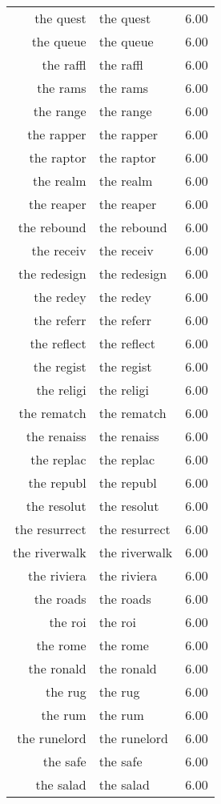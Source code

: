 \begin{table}[ht]
\begin{tabular}{rlr}
  the quest & the quest & 6.00 \\ 
  the queue & the queue & 6.00 \\ 
  the raffl & the raffl & 6.00 \\ 
  the rams & the rams & 6.00 \\ 
  the range & the range & 6.00 \\ 
  the rapper & the rapper & 6.00 \\ 
  the raptor & the raptor & 6.00 \\ 
  the realm & the realm & 6.00 \\ 
  the reaper & the reaper & 6.00 \\ 
  the rebound & the rebound & 6.00 \\ 
  the receiv & the receiv & 6.00 \\ 
  the redesign & the redesign & 6.00 \\ 
  the redey & the redey & 6.00 \\ 
  the referr & the referr & 6.00 \\ 
  the reflect & the reflect & 6.00 \\ 
  the regist & the regist & 6.00 \\ 
  the religi & the religi & 6.00 \\ 
  the rematch & the rematch & 6.00 \\ 
  the renaiss & the renaiss & 6.00 \\ 
  the replac & the replac & 6.00 \\ 
  the republ & the republ & 6.00 \\ 
  the resolut & the resolut & 6.00 \\ 
  the resurrect & the resurrect & 6.00 \\ 
  the riverwalk & the riverwalk & 6.00 \\ 
  the riviera & the riviera & 6.00 \\ 
  the roads & the roads & 6.00 \\ 
  the roi & the roi & 6.00 \\ 
  the rome & the rome & 6.00 \\ 
  the ronald & the ronald & 6.00 \\ 
  the rug & the rug & 6.00 \\ 
  the rum & the rum & 6.00 \\ 
  the runelord & the runelord & 6.00 \\ 
  the safe & the safe & 6.00 \\ 
  the salad & the salad & 6.00 \\ 

\end{tabular}
\end{table}

